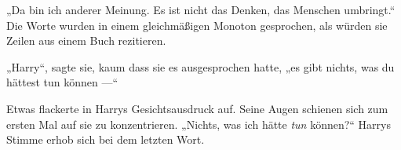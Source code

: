 „Da bin ich anderer Meinung. Es ist nicht das Denken, das Menschen umbringt.“ Die Worte wurden in einem gleichmäßigen Monoton gesprochen, als würden sie Zeilen aus einem Buch rezitieren.

„Harry“, sagte sie, kaum dass sie es ausgesprochen hatte, „es gibt nichts, was du hättest tun können —“


Etwas flackerte in Harrys Gesichtsausdruck auf. Seine Augen schienen sich zum ersten Mal auf sie zu konzentrieren.
„Nichts, was ich hätte \emph{tun} können?“ Harrys Stimme erhob sich bei dem letzten Wort.
